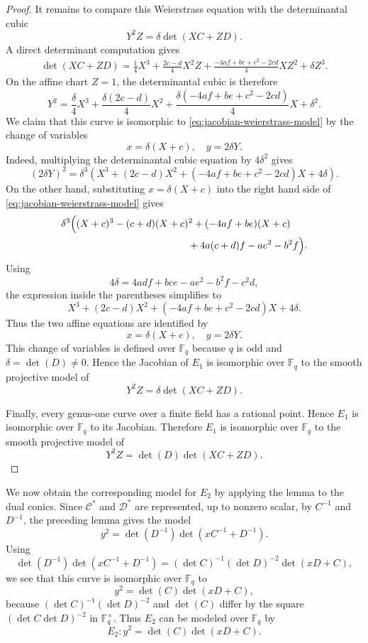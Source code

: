 \documentclass[11pt]{article}
\theoremstyle{definition}
\theoremstyle{definition}
\begin{document}
\begin{proof}
It remains to compare this Weierstrass equation with the determinantal cubic
$$Y^2Z=\delta\det(XC+ZD).$$
A direct determinant computation gives
\begin{align*}
\det(XC+ZD)=\frac{1}{4}X^3+\frac{2c-d}{4}X^2Z+\frac{-4af+be+c^2-2cd}{4}XZ^2+\delta Z^3.
\end{align*}
On the affine chart $Z=1$, the determinantal cubic is therefore
$$
Y^2=
\frac{\delta}{4}X^3+\frac{\delta(2c-d)}{4}X^2
+\frac{\delta(-4af+be+c^2-2cd)}{4}X+\delta^2.
$$
We claim that this curve is isomorphic to \eqref{eq:jacobian-weierstrass-model}
by the change of variables
$$x=\delta(X+c),\quad y=2\delta Y.$$
Indeed, multiplying the determinantal cubic equation by $4\delta^2$ gives
$$
(2\delta Y)^2
=
\delta^3\left(X^3+(2c-d)X^2+(-4af+be+c^2-2cd)X+4\delta\right).
$$
On the other hand, substituting $x=\delta(X+c)$ into the right hand side of
\eqref{eq:jacobian-weierstrass-model} gives
\begin{align*}
&\delta^3\Big((X+c)^3-(c+d)(X+c)^2+(-4af+be)(X+c)\\
&\hspace{4.5cm}+4a(c+d)f-ae^2-b^2f\Big).
\end{align*}
Using
$$4\delta=4adf+bce-ae^2-b^2f-c^2d,$$
the expression inside the parentheses simplifies to
$$X^3+(2c-d)X^2+(-4af+be+c^2-2cd)X+4\delta.$$
Thus the two affine equations are identified by
$$x=\delta(X+c),\quad y=2\delta Y.$$
This change of variables is defined over $\mathbb F_q$ because $q$ is odd and
$\delta=\det(D)\neq 0$. Hence the Jacobian of $E_1$ is isomorphic over
$\mathbb F_q$ to the smooth projective model of
$$Y^2Z=\delta\det(XC+ZD).$$

Finally, every genus-one curve over a finite field has a rational point. Hence
$E_1$ is isomorphic over $\mathbb F_q$ to its Jacobian. Therefore $E_1$ is
isomorphic over $\mathbb F_q$ to the smooth projective model of
$$Y^2Z=\det(D)\det(XC+ZD).$$
\end{proof}

We now obtain the corresponding model for $E_2$ by applying the lemma to the
dual conics. Since $\mathcal C^*$ and $\mathcal D^*$ are represented, up to
nonzero scalar, by $C^{-1}$ and $D^{-1}$, the preceding lemma gives the model
$$
y^2=\det(D^{-1})\det(xC^{-1}+D^{-1}).
$$
Using
$$
\det(D^{-1})\det(xC^{-1}+D^{-1})
=(\det C)^{-1}(\det D)^{-2}\det(xD+C),
$$
we see that this curve is isomorphic over $\mathbb F_q$ to
$$y^2=\det(C)\det(xD+C),$$
because $(\det C)^{-1}(\det D)^{-2}$ and $\det(C)$ differ by the square
$(\det C\det D)^{-2}$ in $\mathbb F_q^\times$. Thus $E_2$ can be modeled over
$\mathbb F_q$ by
$$E_2:y^2=\det(C)\det(xD+C).$$
\end{document}
